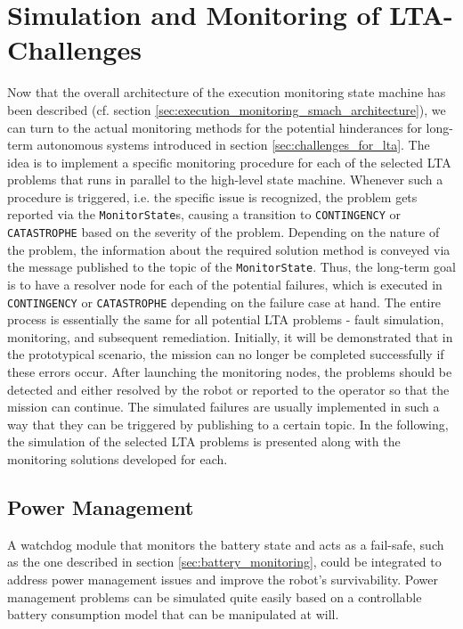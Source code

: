 \documentclass[english, master, utf8]{base/thesis_KBS}
\newcommand{\code}[1]{\colorbox{light-gray}{\texttt{#1}}}
\begin{document}
\section{Simulation and Monitoring of LTA-Challenges}
\label{sec:sim_and_mon_of_lta_challenges}

Now that the overall architecture of the execution monitoring state machine has been described (cf. section \ref{sec:execution_monitoring_smach_architecture}), we can turn to the
actual monitoring methods for the potential hinderances for long-term autonomous systems introduced in section \ref{sec:challenges_for_lta}. The idea is to implement a specific
monitoring procedure for each of the selected LTA problems that runs in parallel to the high-level state machine. Whenever such a procedure is triggered, i.e. the specific issue
is recognized, the problem gets reported via the \code{MonitorState}s, causing a transition to \code{CONTINGENCY} or \code{CATASTROPHE} based on the severity of the problem.
Depending on the nature of the problem, the information about the required solution method is conveyed via the message published to the topic of the \code{MonitorState}.
Thus, the long-term goal is to have a resolver node for each of the potential failures, which is executed in \code{CONTINGENCY} or \code{CATASTROPHE} depending on the
failure case at hand. The entire process is essentially the same for all potential LTA problems - fault simulation, monitoring, and subsequent remediation. 
Initially, it will be demonstrated that in the prototypical scenario, the mission can no longer be completed successfully if these errors occur.
After launching the monitoring nodes, the problems should be detected and either resolved by the robot or reported to the operator so that the mission can continue.
The simulated failures are usually implemented in such a way that they can be triggered by publishing to a certain topic. In the following, the simulation of the selected
LTA problems is presented along with the monitoring solutions developed for each.

\subsection{Power Management}
\label{sec:sim_and_mon_power_management}

A watchdog module that monitors the battery state and acts as a fail-safe, such as the one described in section \ref{sec:battery_monitoring}, could be 
integrated to address power management issues and improve the robot's survivability.\newline
Power management problems can be simulated quite easily based on a controllable battery consumption model that can be manipulated at will.
\end{document}
